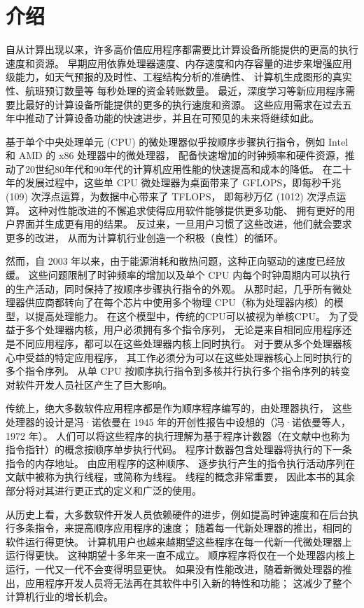 \section{介绍}

自从计算出现以来，许多高价值应用程序都需要比计算设备所能提供的更高的执行速度和资源。 
早期应用依靠处理器速度、内存速度和内存容量的进步来增强应用级能力，如天气预报的及时性、工程结构分析的准确性、
计算机生成图形的真实性、航班预订数量等 每秒处理的资金转账数量。 
最近，深度学习等新应用程序需要比最好的计算设备所能提供的更多的执行速度和资源。 
这些应用需求在过去五年中推动了计算设备功能的快速进步，并且在可预见的未来将继续如此。

基于单个中央处理单元 (CPU) 的微处理器似乎按顺序步骤执行指令，例如 Intel 和 AMD 的 x86 处理器中的微处理器，
配备快速增加的时钟频率和硬件资源，推动了20世纪80年代和90年代的计算机应用性能的快速提高和成本的降低。 
在二十年的发展过程中，这些单 CPU 微处理器为桌面带来了 GFLOPS，即每秒千兆 (109) 次浮点运算，为数据中心带来了 TFLOPS，
即每秒万亿 (1012) 次浮点运算。 这种对性能改进的不懈追求使得应用软件能够提供更多功能、
拥有更好的用户界面并生成更有用的结果。 反过来，一旦用户习惯了这些改进，他们就会要求更多的改进，
从而为计算机行业创造一个积极（良性）的循环。

然而，自 2003 年以来，由于能源消耗和散热问题，这种正向驱动的速度已经放缓。 
这些问题限制了时钟频率的增加以及单个 CPU 内每个时钟周期内可以执行的生产活动，同时保持了按顺序步骤执行指令的外观。 
从那时起，几乎所有微处理器供应商都转向了在每个芯片中使用多个物理 CPU（称为处理器内核）的模型，以提高处理能力。 
在这个模型中，传统的CPU可以被视为单核CPU。 为了受益于多个处理器内核，用户必须拥有多个指令序列，
无论是来自相同应用程序还是不同应用程序，都可以在这些处理器内核上同时执行。 对于要从多个处理器核心中受益的特定应用程序，
其工作必须分为可以在这些处理器核心上同时执行的多个指令序列。 
从单 CPU 按顺序执行指令到多核并行执行多个指令序列的转变对软件开发人员社区产生了巨大影响。

传统上，绝大多数软件应用程序都是作为顺序程序编写的，由处理器执行，
这些处理器的设计是冯·诺依曼在 1945 年的开创性报告中设想的（冯·诺依曼等人，1972 年）。 
人们可以将这些程序的执行理解为基于程序计数器（在文献中也称为指令指针）的概念按顺序单步执行代码。 
程序计数器包含处理器将执行的下一条指令的内存地址。 由应用程序的这种顺序、
逐步执行产生的指令执行活动序列在文献中被称为执行线程，或简称为线程。 线程的概念非常重要，
因此本书的其余部分将对其进行更正式的定义和广泛的使用。

从历史上看，大多数软件开发人员依赖硬件的进步，例如提高时钟速度和在后台执行多条指令，来提高顺序应用程序的速度； 
随着每一代新处理器的推出，相同的软件运行得更快。 计算机用户也越来越期望这些程序在每一代新一代微处理器上运行得更快。 
这种期望十多年来一直不成立。 顺序程序将仅在一个处理器内核上运行，一代又一代不会变得明显更快。 
如果没有性能改进，随着新微处理器的推出，应用程序开发人员将无法再在其软件中引入新的特性和功能； 
这减少了整个计算机行业的增长机会。

